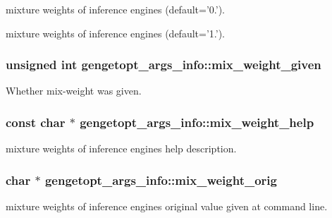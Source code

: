 mixture weights of inference engines (default='0.'). 

mixture weights of inference engines (default='1.'). \hypertarget{structgengetopt__args__info_ab6cdb68b59a319ba28d96f0e1899f720}{
\subsubsection[{mix\+\_\+weight\+\_\+given}]{\setlength{\rightskip}{0pt plus 5cm}unsigned int gengetopt\+\_\+args\+\_\+info\+::mix\+\_\+weight\+\_\+given}}\label{structgengetopt__args__info_ab6cdb68b59a319ba28d96f0e1899f720}


Whether mix-\/weight was given. 

\hypertarget{structgengetopt__args__info_ab851e0e7b97a8147581e5ef2407d000b}{
\subsubsection[{mix\+\_\+weight\+\_\+help}]{\setlength{\rightskip}{0pt plus 5cm}const char $\ast$ gengetopt\+\_\+args\+\_\+info\+::mix\+\_\+weight\+\_\+help}}\label{structgengetopt__args__info_ab851e0e7b97a8147581e5ef2407d000b}


mixture weights of inference engines help description. 

\hypertarget{structgengetopt__args__info_a4c5708197ebf9d7e52ea2a2b7988b5b8}{
\subsubsection[{mix\+\_\+weight\+\_\+orig}]{\setlength{\rightskip}{0pt plus 5cm}char $\ast$ gengetopt\+\_\+args\+\_\+info\+::mix\+\_\+weight\+\_\+orig}}\label{structgengetopt__args__info_a4c5708197ebf9d7e52ea2a2b7988b5b8}


mixture weights of inference engines original value given at command line. 

